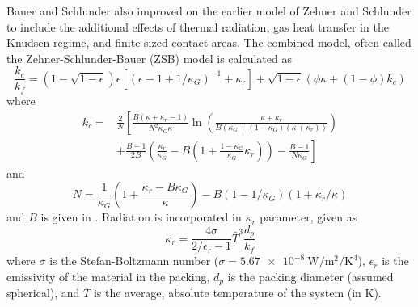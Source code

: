 Bauer and Schlunder \cite{bauer1978effective} also improved on the earlier model of Zehner and Schlunder to include the additional effects of thermal radiation, gas heat transfer in the Knudsen regime, and finite-sized contact areas. The combined model, often called the Zehner-Schlunder-Bauer (ZSB) model is calculated as
\begin{equation}
    \frac{k_e}{k_f} = \left(1-\sqrt{1-\epsilon}\right)\epsilon\left[\left(\epsilon-1+1/\kappa_G\right)^{-1} + \kappa_r\right]+\sqrt{1-\epsilon}\left(\phi\kappa + (1-\phi)k_c\right)
\end{equation}
where
\begin{equation}
\begin{split}
    k_c ={} &\frac{2}{N}\left[\frac{B(\kappa+\kappa_r -1)}{N^2\kappa_G\kappa}\ln\left(\frac{\kappa+\kappa_r}{B(\kappa_G+(1-\kappa_G)(\kappa+\kappa_r))}\right) \right.\\
    &+\left.\frac{B+1}{2B}\left(\frac{\kappa_r}{\kappa_G} - B\left(1+\frac{1-\kappa_G}{\kappa_G}\kappa_r\right) \right) - \frac{B-1}{N\kappa_G}\right]
\end{split}
\end{equation}
and
\begin{equation}
    N = \frac{1}{\kappa_G}\left(1+\frac{\kappa_r-B\kappa_G}{\kappa} \right) - B(1-1/\kappa_G)(1+\kappa_r/\kappa)
\end{equation}
and $B$ is given in . Radiation is incorporated in $\kappa_r$ parameter, given as
\begin{equation}
    \kappa_r = \frac{4\sigma}{2/\epsilon_r - 1}\bar{T}^3\frac{d_p}{k_f}
\end{equation}
where $\sigma$ is the Stefan-Boltzmann number ($\sigma = \SI{5.67e-8}{\watt\per\meter\squared\per\kelvin\tothe{4}}$), $\epsilon_r$ is the emissivity of the material in the packing, $d_p$ is the packing diameter (assumed spherical), and $\bar{T}$ is the average, absolute temperature of the system (in \si{\kelvin}). 

